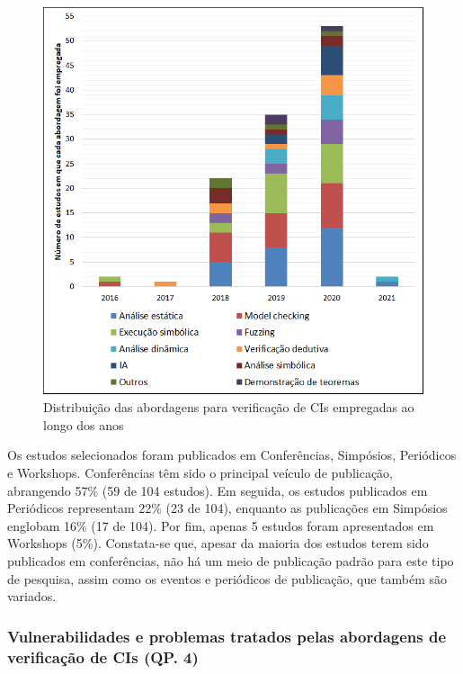 \begin{figure}[!htb]
 \caption{Distribuição das abordagens para verificação de CIs empregadas ao longo dos anos}
 \label{fig:rq2-distribuicao-abordagens}
 \centering
 \includegraphics[scale=0.6]{figuras/rq2-distribuicao-abordagens.png}
 \fdadospesquisa
\end{figure}



Os estudos selecionados foram publicados em Conferências, Simpósios, Periódicos e Workshops. Conferências têm sido o principal veículo de publicação, abrangendo 57\% (59 de 104 estudos). Em seguida, os estudos publicados em Periódicos representam 22\% (23 de 104), enquanto as publicações em Simpósios englobam 16\% (17 de 104). Por fim, apenas 5 estudos foram apresentados em Workshops (5\%). Constata-se que, apesar da maioria dos estudos terem sido publicados em conferências, não há um meio de publicação padrão para este tipo de pesquisa, assim como os eventos e periódicos de publicação, que também são variados.


\subsubsection*{\textbf{Vulnerabilidades e problemas tratados pelas abordagens de verificação de CIs (QP. 4)}}

